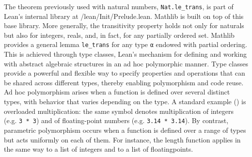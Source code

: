 
The theorem previously used with natural numbers, \lstinline[language=lean]|Nat.le_trans|, 
is part of Lean’s internal library at /lean/Init/Prelude.lean. 
Mathlib is built on top of this base library.
More generally, the transitivity property holds not only for naturals but also for integers, 
reals, and, in fact, for any partially ordered set. 
Mathlib provides a general lemma \lstinline[language=lean]|le_trans| for any type 
\lstinline[language=lean]|α| endowed with partial ordering.
This is achieved through type classes, Lean’s mechanism for defining and working with 
abstract algebraic structures in an ad hoc polymorphic manner.
Type classes provide a powerful and flexible way to specify properties and 
operations that can be shared across different types, thereby enabling 
polymorphism and code reuse.
Ad hoc polymorphism arises when a function is defined over several distinct types, 
with behavior that varies depending on the type. A standard example (\cite{wadler_blott_ad_hoc_polymorphism_1988}) is overloaded 
multiplication: the same symbol denotes multiplication of integers 
(e.g. \lstinline[language=lean]|3 * 3|) and of floating-point numbers 
(e.g. \lstinline[language=lean]|3.14 * 3.14|).
By contrast, parametric polymorphism occurs when a function is defined over a 
range of types but acts uniformly on each of them. For instance, the length 
function applies in the same way to a list of integers and to a list of 
floatingpoints.

